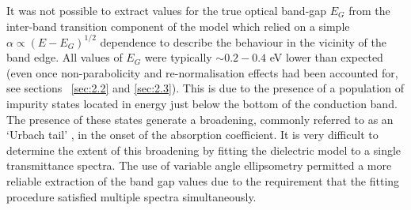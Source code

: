 \documentclass[final,5p,times]{elsarticle}
\begin{document}
It was not possible to extract values for the true optical band-gap $E_G$ from the inter-band transition component of the model which relied on a simple $\alpha\propto(E-E_G)^{1/2}$ dependence to describe the behaviour in the vicinity of the band edge. All values of $E_G$ were typically $\sim 0.2-0.4$ eV lower than expected (even once non-parabolicity and re-normalisation effects had been accounted for, see sections ~\ref{sec:2.2} and \ref{sec:2.3}).  This is due to the presence of a population of impurity states located in energy just below the bottom of the conduction band. The presence of these states generate a broadening, commonly referred to as an `Urbach tail' \cite{Urbach1953}, in the onset of the absorption coefficient. It is very difficult to determine the extent of this broadening by fitting the dielectric model to a single transmittance spectra. The use of variable angle ellipsometry permitted a more reliable extraction of the band gap values due to the requirement that the fitting procedure satisfied multiple spectra simultaneously.
\end{document}
